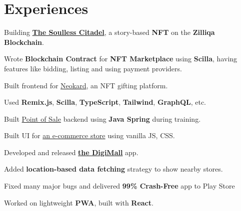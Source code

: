 \documentclass[]{deedy-resume-openfont}
\begin{document}
\begin{minipage}[t]{0.67\textwidth} 



\section{Experiences}
\vspace{\topsep} %
\begin{tightemize}
\item Building \href{https://soullesscitadel.com/}{\textbf{The Soulless Citadel}}, a story-based \textbf{NFT} on the \textbf{Zilliqa Blockchain}. 
\item Wrote \textbf{Blockchain Contract} for \textbf{NFT Marketplace} using \textbf{Scilla}, having features like bidding, listing and using payment providers.
\item Built frontend for \href{https://neokard.com/}{Neokard}, an NFT gifting platform.
\item Used \textbf{Remix.js}, \textbf{Scilla}, \textbf{TypeScript}, \textbf{Tailwind}, \textbf{GraphQL}, etc.
\end{tightemize}
\sectionsep


\begin{tightemize}
\item Built \href{https://github.com/kishanhitk/pos}{Point of Sale} backend using \textbf{Java Spring} during training.
\item Built UI for \href{https://github.com/kishanhitk/ecom-ui-increff}{an e-commerce store} using vanilla JS, CSS.
\end{tightemize}
\sectionsep


\begin{tightemize}
\item Developed and released \href{https://play.google.com/store/apps/details?id=com.business.prachar}{\textbf{the DigiMall}} app.
\item Added \textbf{location-based data fetching} strategy to show nearby stores. 
\item Fixed many major bugs and delivered \textbf{99\% Crash-Free} app to Play Store
\item Worked on lightweight \textbf{PWA}, built with \textbf{React}.
\end{tightemize}
\sectionsep


\end{minipage}
\end{document}
